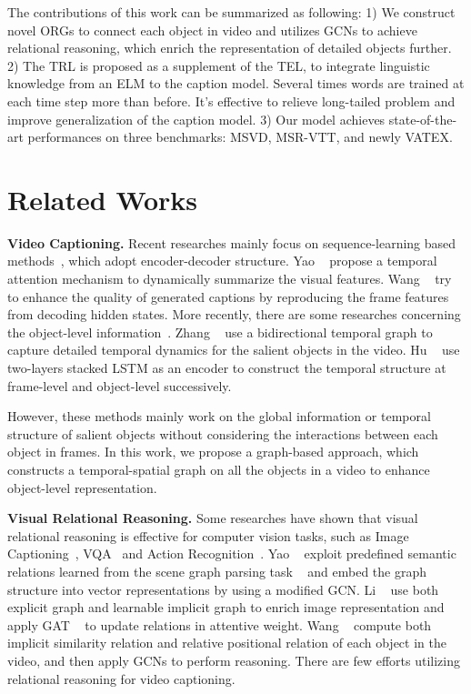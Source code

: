 \documentclass[10pt,twocolumn,letterpaper]{article}
\begin{document}
The contributions of this work can be summarized as following: 1) We construct novel ORGs to connect each object in video and utilizes GCNs to achieve relational reasoning, which enrich the representation of detailed objects further. 2) The TRL is proposed as a supplement of the TEL, to integrate linguistic knowledge from an ELM to the caption model. Several times words are trained at each time step more than before. It's effective to relieve long-tailed problem and improve generalization of the caption model. 3) Our model achieves state-of-the-art performances on three benchmarks: MSVD, MSR-VTT, and newly VATEX.

\section{Related Works}
\textbf{Video Captioning.} Recent researches mainly focus on sequence-learning based methods~\cite{Venugopalan2015, Yao2015, Yu2016, Pan2016, Pan2016b, Wang2018a, Pei2019}, which adopt encoder-decoder structure. Yao \etal~\cite{Yao2015} propose a temporal attention mechanism to dynamically summarize the visual features. Wang \etal~\cite{Wang2018a} try to enhance the quality of generated captions by reproducing the frame features from decoding hidden states. More recently, there are some researches concerning the object-level information~\cite{Yang2017, Zhang2019, Hu2019}. Zhang \etal~\cite{Zhang2019} use a bidirectional temporal graph to capture detailed temporal dynamics for the salient objects in the video. Hu \etal~\cite{Hu2019} use two-layers stacked LSTM as an encoder to construct the temporal structure at frame-level and object-level successively.

However, these methods mainly work on the global information or temporal structure of salient objects without considering the interactions between each object in frames. In this work, we propose a graph-based approach, which constructs a temporal-spatial graph on all the objects in a video to enhance object-level representation.

\textbf{ Visual Relational Reasoning.} Some researches have shown that visual relational reasoning is effective for computer vision tasks, such as Image Captioning~\cite{Yao2018, Yang2019}, VQA~\cite{Norcliffe-Brown2018, Narasimhan2018, Li2019} and Action Recognition~\cite{Wang2018, Wang2018b}. Yao \etal~\cite{Yao2018} exploit predefined semantic relations learned from the scene graph parsing task ~\cite{Zellers2018} and embed the graph structure into vector representations by using a modified GCN. Li \etal~\cite{Li2019} use both explicit graph and learnable implicit graph to enrich image representation and apply GAT ~\cite{Velickovic2017} to update relations in attentive weight. Wang \etal~\cite{Wang2018b} compute both implicit similarity relation and relative positional relation of each object in the video, and then apply GCNs to perform reasoning. There are few efforts utilizing relational reasoning for video captioning. 
\end{document}
